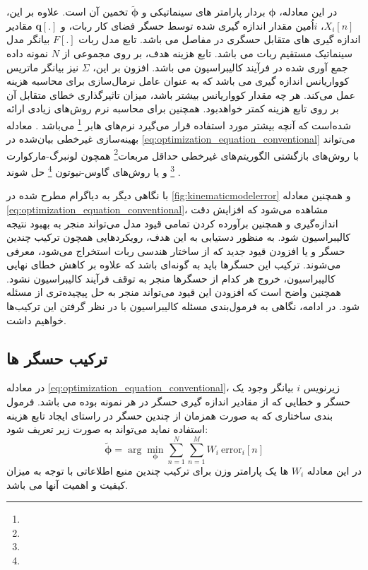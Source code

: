 در این معادله، $\boldsymbol{\phi}$ بردار پارامتر های سینماتیکی و $\tilde{\boldsymbol{\phi}}$ تخمین آن است. علاوه بر این، $X_i[n]$، 
$i$اُمین
مقدار اندازه گیری شده توسط حسگر فضای کار ربات، و $\boldsymbol{q}[.]$ مقادیر اندازه گیری های متقابل حسگری در مفاصل می باشد. تابع مدل ربات $F[.]$ بیانگر مدل سینماتیک مستقیم ربات می باشد. تابع هزینه هدف، بر روی مجموعی از $N$ نمونه داده جمع آوری شده در فرآیند کالیبراسیون می باشد. افزون بر این، $\Sigma$ نیز بیانگر ماتریس کوواریانس اندازه گیری می باشد که به عنوان عامل نرمال‌سازی برای محاسبه هزینه عمل می‌کند. هر چه مقدار کوواریانس بیشتر باشد، میزان تاثیر‌گذاری خطای متقابل آن بر روی تابع هزینه کمتر خواهد‌بود. همچنین برای محاسبه نرم روش‌های زیادی ارائه شده‌است که آنچه بیشتر مورد استفاده قرار می‌گیرد نرم‌های هابر 
\footnote{}
می‌باشد
\cite{chang2015huber}.
معادله بهینه‌سازی غیر‌خطی بیان‌شده در 
\ref{eq:optimization_equation_conventional}
می‌تواند با روش‌های بازگشتی الگوریتم‌های غیر‌خطی حداقل مربعات\footnote{}
همچون لونبرگ-مارکوارت
\footnote{}
و یا روش‌های گاوس-نیوتون
\footnote{}
حل شوند
\cite{dellart_robot_perception}.

با نگاهی دیگر به دیاگرام مطرح شده در 
\ref{fig:kinematicmodelerror}
و همچنین معادله 
\ref{eq:optimization_equation_conventional}،
مشاهده می‌شود که افزایش دقت اندازه‌گیری و همچنین برآورده کردن تمامی قیود مدل می‌تواند منجر به بهبود نتیجه کالیبراسیون شود. به منظور دستیابی به این هدف، رویکردهایی همچون ترکیب چندین حسگر و یا افزودن قیود جدید که از ساختار هندسی ربات استخراج می‌شود، معرفی می‌شوند. ترکیب این حسگرها باید به گونه‌ای باشد که علاوه بر کاهش خطای نهایی کالیبراسیون، خروج هر کدام از حسگرها منجر به توقف فرآیند کالیبراسیون نشود. همچنین واضح است که افزودن این قیود می‌تواند منجر به حل پیچیده‌تری از مسئله شود. در ادامه، نگاهی به فرمول‌بندی مسئله کالیبراسیون با در نظر گرفتن این ترکیب‌ها خواهیم داشت.

\subsection{ترکیب حسگر ها}
در معادله 
\ref{eq:optimization_equation_conventional}،
زیرنویس 
$i$
بیانگر وجود یک حسگر و خطایی که از مقادیر اندازه گیری حسگر در هر نمونه بوده می باشد. فرمول بندی ساختاری که به صورت همزمان از چندین حسگر در راستای ایجاد تابع هزینه استفاده نماید می‌تواند به صورت زیر تعریف شود:
\begin{equation}\label{eq:optimization_equation_conventional_multi_sensor}
	\tilde{\boldsymbol{\phi}} =  \arg\min_{\boldsymbol{\phi}} \sum_{n = 1 }^{N} \sum_{n = 1 }^{M} W_i~\text{error}_i[n] 
\end{equation}
در این معادله 
$W_i$
ها یک پارامتر وزن برای ترکیب چندین منبع اطلاعاتی با توجه به میزان کیفیت و اهمیت آنها می باشد.


